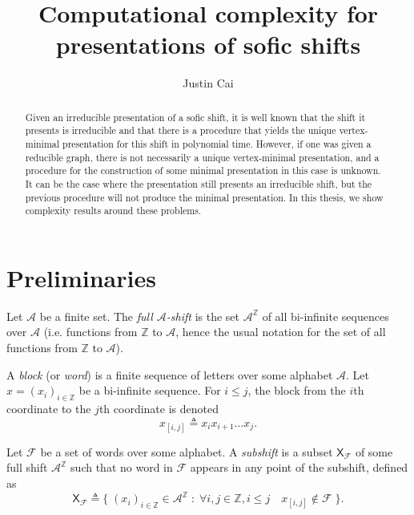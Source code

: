 \documentclass{article}
\title{Computational complexity for presentations of sofic shifts}
\author{Justin Cai}
\newcommand{\Ac}{\mathcal{A}}  %
\newcommand{\Fc}{\mathcal{F}}
\newcommand{\shift}[1]{\mathsf{X}_{#1}}
\newcommand{\term}[1]{\textit{#1}}
\theoremstyle{definition}
\begin{document}
\maketitle

\begin{abstract}
    Given an irreducible presentation of a sofic shift, it is well known that the 
    shift it presents is irreducible and that there is a 
    procedure that yields the unique vertex-minimal presentation for
    this shift in polynomial time. However, if one was given a reducible 
    graph, there is not necessarily a unique vertex-minimal presentation, and 
    a procedure for the construction of some minimal presentation in 
    this case is unknown. It can be the case where the presentation still presents 
    an irreducible shift, but the previous procedure will not produce the 
    minimal presentation. In this thesis, we show complexity results around 
    these problems.
\end{abstract}


\section{Preliminaries}

\begin{definition}
    Let \(\Ac\) be a finite set. The \term{full \(\Ac\)-shift} is the set \(\Ac^\mathbb{Z}\) of all 
    bi-infinite sequences over \(\Ac\) (i.e. functions from \(\mathbb{Z}\) to \(\Ac\), hence the 
    usual notation for the set of all functions from \(\mathbb{Z}\) to \(\Ac\)).
\end{definition}

\noindent A \term{block} (or \term{word}) is a finite sequence of letters over some alphabet \(\Ac\). 
Let \(x=(x_i)_{i \in \mathbb{Z}}\) be a bi-infinite sequence. For \(i \leq j\), the block from the 
\(i\)th coordinate to the \(j\)th coordinate is denoted \[x_{[i,j]} \triangleq x_i x_{i+1} \dots x_{j}.\]

\begin{definition}
    Let \(\Fc\) be a set of words over some alphabet. A \term{subshift} is a subset \(\shift{\Fc}\)
    of some full shift \(\Ac^\mathbb{Z}\) such that no word in \(\Fc\) appears in any point of the subshift,
    defined as
    \[\shift{\Fc} \triangleq \Big\{ \; (x_i)_{i \in \mathbb{Z}} \in \Ac^\mathbb{Z} \; : \; \forall i, j \in \mathbb{Z}, i\leq j \quad  x_{[i,j]} \notin \Fc \; \Big\}.\]
\end{definition}
\end{document}
